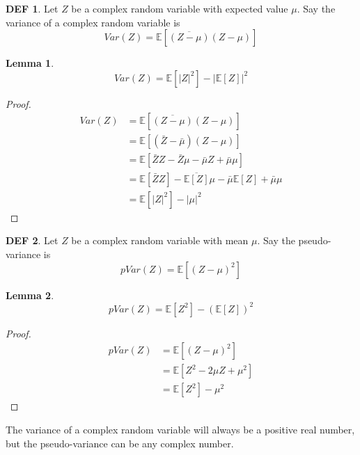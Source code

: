 \documentclass{article}
\theoremstyle{definition}\newtheorem{definition}{DEF}
\theoremstyle{lemma}\newtheorem{lemma}{Lemma}
\theoremstyle{corrolary}\newtheorem{corrolary}{Cor}
\begin{document}
\begin{definition}
Let $Z$ be a complex random variable with expected value $\mu$.
Say the variance of a complex random variable is
\begin{equation}
Var(Z) = \mathbb{E}[\overline{(Z-\mu)}(Z-\mu)]
\end{equation}
\end{definition}

\begin{lemma}
\begin{equation}
Var(Z) = \mathbb{E}[|Z|^2] - |\mathbb{E}[Z]|^2
\end{equation}
\end{lemma}
\begin{proof}
\begin{align*}
Var(Z)
&= \mathbb{E}[\overline{(Z - \mu)}(Z - \mu)] \\
&= \mathbb{E}[(\bar{Z} - \bar{\mu})(Z-\mu)] \\
&=\mathbb{E}[\bar{Z}Z -\bar{Z}\mu -\bar{\mu}Z + \bar{\mu}\mu] \\
&=\mathbb{E}[\bar{Z}Z] -\overline{\mathbb{E}[Z]}\mu - \bar{\mu}\mathbb{E}[Z] + \bar{\mu}\mu  \\
&= \mathbb{E}[|Z|^2] - |\mu|^2
\end{align*}
\end{proof}

\begin{definition}
Let $Z$ be a complex random variable with mean $\mu$.
Say the pseudo-variance is
\begin{equation}
pVar(Z) = \mathbb{E}[(Z-\mu)^2]
\end{equation}
\end{definition}

\begin{lemma}
\begin{equation}
pVar(Z) = \mathbb{E}[Z^2] - (\mathbb{E}[Z])^2
\end{equation}
\end{lemma}
\begin{proof}
\begin{align*}
pVar(Z)
&= \mathbb{E}[(Z-\mu)^2] \\
&= \mathbb{E}[Z^2 - 2\mu Z + \mu^2] \\
&= \mathbb{E}[Z^2] - \mu^2
\end{align*}
\end{proof}

The variance of a complex random variable will always be a positive real number, but the pseudo-variance can be any complex number.
\end{document}

